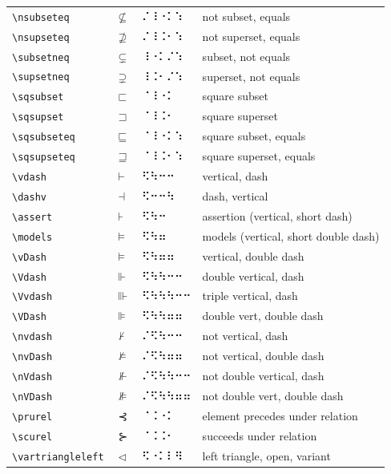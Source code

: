 \documentclass[oneside]{article}
\begin{document}
\begin{longtable}{llll}
\verb|\nsubseteq| & $\nsubseteq$ &   ⠌⠸⠐⠅⠱   & {not subset, equals} \\[2ex]
\verb|\nsupseteq| & $\nsupseteq$ &   ⠌⠸⠨⠂⠱   & {not superset, equals} \\[2ex]
\verb|\subsetneq| & $\subsetneq$ &   ⠸⠐⠅⠌⠱   & {subset, not equals} \\[2ex]
\verb|\supsetneq| & $\supsetneq$ &   ⠸⠨⠂⠌⠱   & {superset, not equals} \\[2ex]
\verb|\sqsubset| & $\sqsubset$ &   ⠈⠸⠐⠅   & {square subset} \\[2ex]
\verb|\sqsupset| & $\sqsupset$ &   ⠈⠸⠨⠂   & {square superset} \\[2ex]
\verb|\sqsubseteq| & $\sqsubseteq$ &   ⠈⠸⠐⠅⠱   & {square subset, equals} \\[2ex]
\verb|\sqsupseteq| & $\sqsupseteq$ &   ⠈⠸⠨⠂⠱   & {square superset, equals} \\[2ex]
\verb|\vdash| & $\vdash$ &   ⠫⠳⠒⠒   & {vertical, dash} \\[2ex]
\verb|\dashv| & $\dashv$ &   ⠫⠒⠒⠳   & {dash, vertical} \\[2ex]
\verb|\assert| & $\assert$ &   ⠫⠳⠒   & {assertion (vertical, short dash)} \\[2ex]
\verb|\models| & $\models$ &   ⠫⠳⠶   & {models (vertical, short double dash)} \\[2ex]
\verb|\vDash| & $\vDash$ &   ⠫⠳⠶⠶   & {vertical, double dash} \\[2ex]
\verb|\Vdash| & $\Vdash$ &   ⠫⠳⠳⠒⠒   & {double vertical, dash} \\[2ex]
\verb|\Vvdash| & $\Vvdash$ &   ⠫⠳⠳⠳⠒⠒   & {triple vertical, dash} \\[2ex]
\verb|\VDash| & $\VDash$ &   ⠫⠳⠳⠶⠶   & {double vert, double dash} \\[2ex]
\verb|\nvdash| & $\nvdash$ &   ⠌⠫⠳⠒⠒   & {not vertical, dash} \\[2ex]
\verb|\nvDash| & $\nvDash$ &   ⠌⠫⠳⠶⠶   & {not vertical, double dash} \\[2ex]
\verb|\nVdash| & $\nVdash$ &   ⠌⠫⠳⠳⠒⠒   & {not double vertical, dash} \\[2ex]
\verb|\nVDash| & $\nVDash$ &   ⠌⠫⠳⠳⠶⠶   & {not double vert, double dash} \\[2ex]
\verb|\prurel| & $\prurel$ &   ⠈⠨⠐⠅   & {element precedes under relation} \\[2ex]
\verb|\scurel| & $\scurel$ &   ⠈⠨⠨⠂   & {succeeds under relation} \\[2ex]
\verb|\vartriangleleft| & $\vartriangleleft$ &   ⠫⠐⠅⠇⠻   & {left triangle, open, variant} \\[2ex]

\end{longtable}
\end{document}

